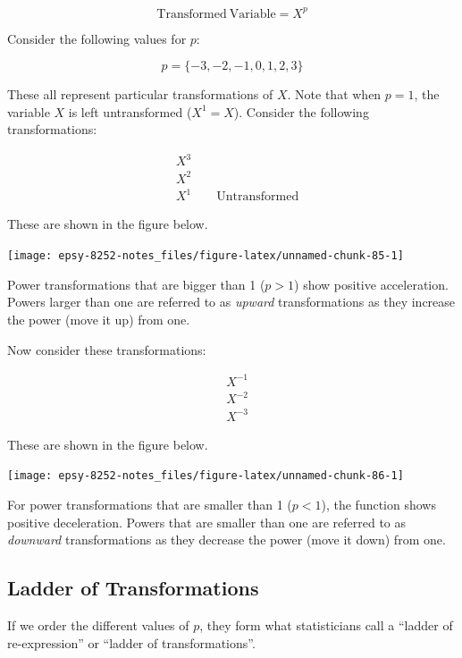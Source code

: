 \documentclass[]{book}
\begin{document}
\[
\mathrm{Transformed~Variable} = X^p
\]

Consider the following values for \(p\):

\[
p = \{-3,-2,-1,0,1,2,3\}
\]

These all represent particular transformations of \(X\). Note that when \(p=1\), the variable \(X\) is left untransformed (\(X^1 = X\)). Consider the following transformations:

\[
\begin{split}
&X^3 \\
&X^2 \\
&X^1 \qquad \mathrm{Untransformed}
\end{split}
\]

These are shown in the figure below.

\begin{center}\texttt{[image: epsy-8252-notes\_files/figure-latex/unnamed-chunk-85-1]} \end{center}

Power transformations that are bigger than 1 (\(p>1\)) show positive acceleration. Powers larger than one are referred to as \emph{upward} transformations as they increase the power (move it up) from one.

Now consider these transformations:

\[
\begin{split}
&X^{-1} \\
&X^{-2} \\
&X^{-3}
\end{split}
\]

These are shown in the figure below.

\begin{center}\texttt{[image: epsy-8252-notes\_files/figure-latex/unnamed-chunk-86-1]} \end{center}

For power transformations that are smaller than 1 (\(p<1\)), the function shows positive deceleration. Powers that are smaller than one are referred to as \emph{downward} transformations as they decrease the power (move it down) from one.

\hypertarget{ladder-of-transformations}{%
\subsection*{Ladder of Transformations}\label{ladder-of-transformations}}

If we order the different values of \(p\), they form what statisticians call a ``ladder of re-expression'' or ``ladder of transformations''.
\end{document}

